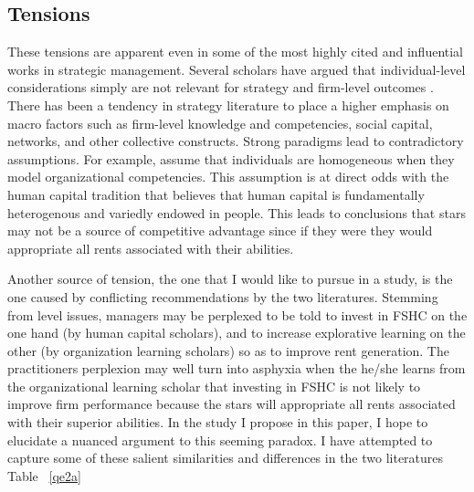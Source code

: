 \documentclass[12pt,letterpaper]{article}
\begin{document}
\subsection{Tensions}
These tensions are apparent even in some of the most highly cited and influential works in strategic management. Several scholars have  argued that individual-level considerations simply are not relevant for strategy and firm-level outcomes \citep{Henderson1994, Kogut1992, Kogut1996, Nahapiet1998, Spender1996}. There has been a tendency in strategy literature to place a higher emphasis on macro factors such as firm-level knowledge and competencies, social capital, networks, and other collective constructs. Strong paradigms lead to contradictory assumptions. For example, \citep{Henderson1994} assume that individuals are homogeneous when they model organizational competencies. This assumption is at direct odds with the human capital tradition that believes that human capital is fundamentally heterogenous and variedly endowed in people. This leads to conclusions that stars may not be a source of competitive advantage since if they were they would appropriate all rents associated with their abilities. \par

Another source of tension, the one that I would like to pursue in a study, is the one caused by conflicting recommendations by the two literatures. Stemming from level issues, managers may be perplexed to be told to invest in FSHC on the one hand (by human capital scholars), and to increase explorative learning on the other (by organization learning scholars) so as to improve rent generation. The practitioner\textquotesingle s perplexion may well turn into asphyxia when the he/she learns from the organizational learning scholar that investing in FSHC is not likely to improve firm performance because the stars will appropriate all rents associated with their superior abilities. In the study I propose in this paper, I hope to elucidate a nuanced argument to this seeming paradox. I have attempted to capture some of these salient similarities and differences in the two literatures Table ~\ref{qe2a}
\end{document}

